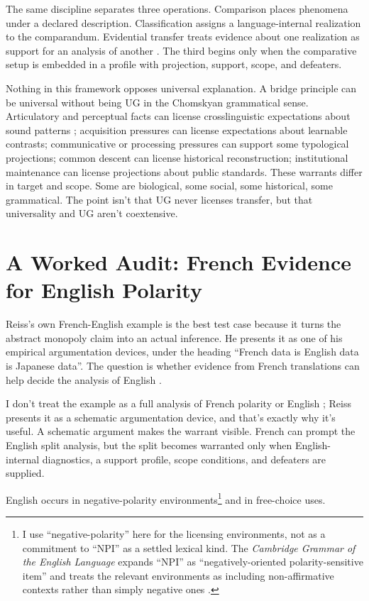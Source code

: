 \documentclass[12pt]{article}
\begin{document}
The same discipline separates three operations. Comparison places phenomena under a declared description. Classification assigns a language-internal realization to the comparandum. Evidential transfer treats evidence about one realization as support for an analysis of another \citep{reynolds2025comparanda}. The third begins only when the comparative setup is embedded in a profile with projection, support, scope, and defeaters.

Nothing in this framework opposes universal explanation. A bridge principle can be universal without being UG in the Chomskyan grammatical sense. Articulatory and perceptual facts can license crosslinguistic expectations about sound patterns \citep{ohala1990}; acquisition pressures can license expectations about learnable contrasts; communicative or processing pressures can support some typological projections; common descent can license historical reconstruction; institutional maintenance can license projections about public standards. These warrants differ in target and scope. Some are biological, some social, some historical, some grammatical. The point isn't that UG never licenses transfer, but that universality and UG aren't coextensive.

\section{A Worked Audit: French Evidence for English Polarity}

Reiss's own French-English example is the best test case because it turns the abstract monopoly claim into an actual inference. He presents it as one of his empirical argumentation devices, under the heading \enquote{French data is English data is Japanese data}. The question is whether evidence from French translations can help decide the analysis of English  \citep[sec.~5.3.3]{reiss2026armchair}.

I don't treat the example as a full analysis of French polarity or English ; Reiss presents it as a schematic argumentation device, and that's exactly why it's useful. A schematic argument makes the warrant visible. French can prompt the English split analysis, but the split becomes warranted only when English-internal diagnostics, a support profile, scope conditions, and defeaters are supplied.

English  occurs in negative-polarity environments\footnote{I use \enquote{negative-polarity} here for the licensing environments, not as a commitment to \enquote{NPI} as a settled lexical kind. The \emph{Cambridge Grammar of the English Language} expands \enquote{NPI} as \enquote{negatively-oriented polarity-sensitive item} and treats the relevant environments as including non-affirmative contexts rather than simply negative ones \citep[822--838]{huddleston2002}.} and in free-choice uses.
\end{document}

